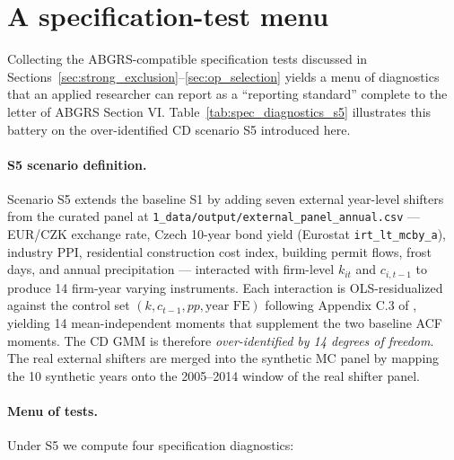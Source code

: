 \documentclass[11pt]{article}
\begin{document}
\section{A specification-test menu}\label{sec:spec_tests}

Collecting the ABGRS-compatible specification tests discussed in Sections~\ref{sec:strong_exclusion}--\ref{sec:op_selection} yields a menu of diagnostics that an applied researcher can report as a ``reporting standard'' complete to the letter of ABGRS \cite{ABGRS2025} Section VI. Table~\ref{tab:spec_diagnostics_s5} illustrates this battery on the over-identified CD scenario S5 introduced here.

\begin{table}[htbp]
\centering
\caption{Specification diagnostics for the over-identified Cobb-Douglas scenario S5 (one MC draw, seed $20260415$)}
\label{tab:spec_diagnostics_s5}
\small

\end{table}

\paragraph{S5 scenario definition.} Scenario S5 extends the baseline S1 by adding seven external year-level shifters from the curated panel at \texttt{1\_data/output/\allowbreak external\_panel\_annual.csv} --- EUR/CZK exchange rate, Czech 10-year bond yield (Eurostat \texttt{irt\_lt\_mcby\_a}), industry PPI, residential construction cost index, building permit flows, frost days, and annual precipitation --- interacted with firm-level $k_{it}$ and $c_{i,t-1}$ to produce 14 firm-year varying instruments. Each interaction is OLS-residualized against the control set $(k, c_{t-1}, pp, \text{year FE})$ following Appendix C.3 of \citet{ABGRS2025}, yielding 14 mean-independent moments that supplement the two baseline ACF moments. The CD GMM is therefore \emph{over-identified by 14 degrees of freedom}. The real external shifters are merged into the synthetic MC panel by mapping the 10 synthetic years onto the 2005--2014 window of the real shifter panel.

\paragraph{Menu of tests.} Under S5 we compute four specification diagnostics:
\end{document}
